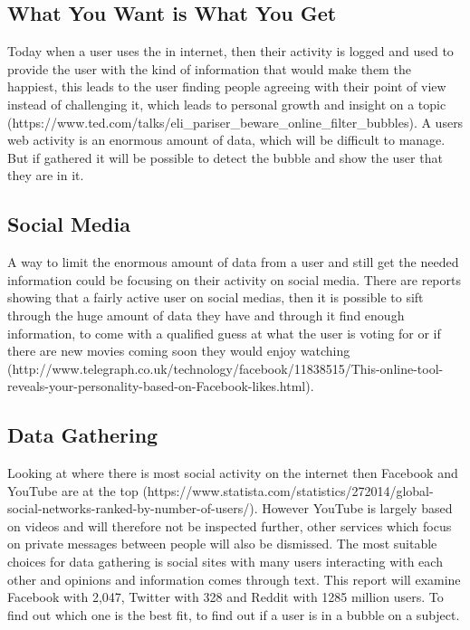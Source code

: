 \subsection{What You Want is What You Get}
Today when a user uses the in internet, then their activity is logged and used to provide the user with the kind of information that would make them the happiest, this leads to the user finding people agreeing with their point of view instead of challenging it, which leads to personal growth and insight on a topic (https://www.ted.com/talks/eli_pariser_beware_online_filter_bubbles). A users web activity is an enormous amount of data, which will be difficult to manage. But if gathered it will be possible to detect the bubble and show the user that they are in it.

\subsection{Social Media}
A way to limit the enormous amount of data from a user and still get the needed information could be focusing on their activity on social media. There are reports showing that a fairly active user on social medias, then it is possible to sift through the huge amount of data they have and through it find enough information, to come with a qualified guess at what the user is voting for or if there are new movies coming soon they would enjoy watching (http://www.telegraph.co.uk/technology/facebook/11838515/This-online-tool-reveals-your-personality-based-on-Facebook-likes.html).

\subsection{Data Gathering}
Looking at where there is most social activity on the internet then Facebook and YouTube are at the top (https://www.statista.com/statistics/272014/global-social-networks-ranked-by-number-of-users/). However YouTube is largely based on videos and will therefore not be inspected further, other services which focus on private messages between people will also be dismissed. The most suitable choices for data gathering is social sites with many users interacting with each other and opinions and information comes through text. This report will examine Facebook with 2,047, Twitter with 328 and Reddit with 1285 million users. To find out which one is the best fit, to find out if a user is in a bubble on a subject.

